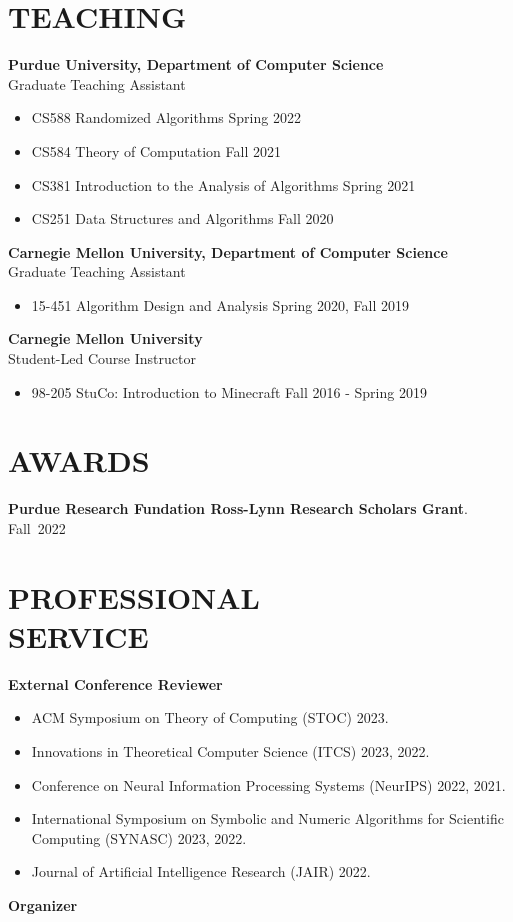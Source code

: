 \documentclass[margin, 10pt]{res} %
\begin{document}
\begin{resume}
\section{TEACHING}

{\bf Purdue University, Department of Computer Science}\\
Graduate Teaching Assistant

\begin{itemize}
\item CS588 Randomized Algorithms \hfill Spring 2022
\item CS584 Theory of Computation \hfill Fall 2021
\item CS381 Introduction to the Analysis of Algorithms \hfill Spring 2021
\item CS251 Data Structures and Algorithms \hfill Fall 2020
\end{itemize}
{\bf Carnegie Mellon University, Department of Computer Science}\\
Graduate Teaching Assistant

\begin{itemize}
\item 15-451 Algorithm Design and Analysis \hfill Spring 2020, Fall 2019
\end{itemize}

{\bf Carnegie Mellon University}\\
Student-Led Course Instructor

\begin{itemize}
\item 98-205 StuCo: Introduction to Minecraft \hfill Fall 2016 - Spring 2019
\end{itemize}

\section{AWARDS}
{\bf Purdue Research Fundation Ross-Lynn Research Scholars Grant}. \hfill Fall~2022

\section{PROFESSIONAL \\ SERVICE}

{\bf External Conference Reviewer}

\begin{itemize}
\item ACM Symposium on Theory of Computing (STOC) 2023.
\item Innovations in Theoretical Computer Science (ITCS) 2023, 2022.
\item Conference on Neural Information Processing Systems (NeurIPS) 2022, 2021.
\item International Symposium on Symbolic and Numeric Algorithms for Scientific Computing (SYNASC) 2023, 2022.
\item Journal of Artificial Intelligence Research (JAIR) 2022.
\end{itemize}
{\bf Organizer}


\end{resume}
\end{document}
